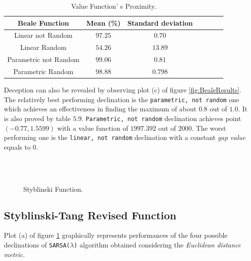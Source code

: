 \begin{table}[h!]
	\centering
	\resizebox{\linewidth}{!} {
		\begin{tabular}{c| cccccc} 
			\hline \textbf{Beale Function}
			& \textbf{Mean (\%)} & \textbf{Standard deviation} \\ 
			\hline Linear not Random
			& $97.25$ & \cellcolor{green!25}$0.70$\\ 
			\hline Linear Random
			& $54.26$ & $13.89$\\ 
			\hline Parametric not Random
			& \cellcolor{green!25}$99.06$ & $0.81$ \\ 
			\hline Parametric Random
			& $98.88$ & $0.798$ \\ 
			\hline 
		\end{tabular} 
}
	\label{BealeTabProximity}
	\caption{Value Function' s Proximity.} 
\end{table}

Deception can also be revealed by observing plot (c) of figure \ref{fig:BealeResults}. The relatively best performing declination is the {\tt parametric, not random} one which achieves an effectiveness in finding the maximum of about $0.8$ out of $1.0$. It is also proved by table $5.9$. {\tt Parametric, not random} declination achieves point $(-0.77, 1.5599)$ with a value function of $1997.392$ out of $2000$. The worst performing one is the {\tt linear, not random} declination with a constant \textit{gap value} equals to $0$.

\begin{figure}[h!]
	\begin{center}
		\\
		 \\
		
	\end{center}
	\caption{
		Styblinski Function.
	}
	\label{fig:StyblinskiResults}
\end{figure}

\subsection{Styblinski-Tang Revised Function} Plot (a) of figure \ref{fig:StyblinskiResults} graphically represents performances of the four possible declinations of {\tt SARSA($\lambda$)} algorithm obtained considering the \textit{Euclidean distance metric}. 

